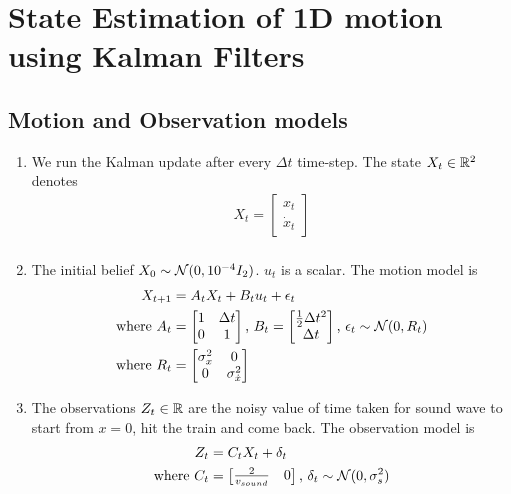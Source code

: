 \section{State Estimation of 1D motion using Kalman Filters}
\subsection{Motion and Observation models}\label{sec:kinematics_train}
\begin{enumerate}
\item 
We run the Kalman update after every $\Delta t$ time-step. The state $X_t \in \mathbb{R}^2$ denotes
\begin{align*}
X_t = \begin{bmatrix} x_t \\ \dot{x}_t \end{bmatrix}\\
\end{align*}
\item The initial belief $X_0 \sim \mathcal{N}(0, 10^{-4} I_2)$. $u_t$ is a scalar. The motion model is
\begin{align*}
X_{t + 1} &= A_t X_{t} + B_t u_t + \epsilon_t\\
\text{where }
A_t &= \begin{bmatrix} 
1 & \Delta t \\ 
0 & 1 
\end{bmatrix}
\text{, }
B_t = \begin{bmatrix} 
\frac{1}{2} \Delta t^2 \\ 
\Delta t 
\end{bmatrix}
\text{, }
\epsilon_t \sim \mathcal{N}(0, R_t)\\
\text{where }
R_t &= \begin{bmatrix} 
\sigma_x^2 & 0 \\ 
0 & \sigma_{\dot{x}}^2 
\end{bmatrix}
\end{align*}

\item The observations $Z_t \in \mathbb{R}$ are the noisy value of time taken for sound wave to start from $x = 0$, hit the train and come back. The observation model is
\begin{align*}
Z_t &= C_t X_t + \delta_t\\
\text{where } 
C_t &= \begin{bmatrix} 
\frac{2}{v_{sound}} & 0
\end{bmatrix}
\text{, }
\delta_t \sim \mathcal{N}(0, \sigma_s^2)
\end{align*}
\end{enumerate}
